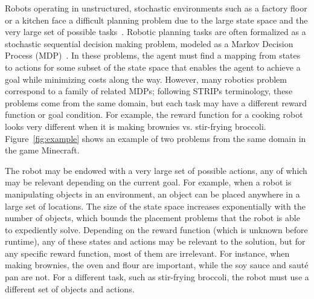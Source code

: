\documentclass[letterpaper]{article}
\begin{document}
Robots operating in unstructured, stochastic environments such as a
factory floor or a kitchen face a difficult planning problem due to
the large state space and the very large set of possible
tasks~\citep{bollini12,knepper13}.  Robotic planning tasks are often
formalized as a stochastic sequential decision making problem, modeled
as a Markov Decision Process (MDP)~\citep{thrun2008probabilistic}. In
these problems, the agent must find a mapping from states to actions
for some subset of the state space that enables the agent to achieve a
goal while minimizing costs along the way.  However, many robotics
problem correspond to a family of related MDPs; following STRIPs
terminology, these problems come from the same domain, but each task
may have a different reward function or goal condition.  For example,
the reward function for a cooking robot looks very different when it
is making brownies vs. stir-frying broccoli.  Figure~\ref{fig:example}
shows an example of two problems from the same domain in the game
Minecraft.

The robot may be endowed with a very large set of possible actions,
any of which may be relevant depending on the current goal.  For
example, when a robot is manipulating objects in an environment, an
object can be placed anywhere in a large set of locations.  The size
of the state space increases exponentially with the number of objects,
which bounds the placement problems that the robot is able to
expediently solve.  Depending on the reward function (which is unknown
before runtime), any of these states and actions may be relevant to
the solution, but for any specific reward function, most of them are
irrelevant.  For instance, when making brownies, the oven and flour
are important, while the soy sauce and saut\'{e} pan are not.  For a
different task, such as stir-frying broccoli, the robot must use a
different set of objects and actions.

\end{document}
